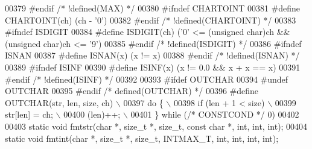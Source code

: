 \begin{DoxyCode}
{00379 \textcolor{preprocessor}{#endif  }\textcolor{comment}{/* !defined(MAX) */}\textcolor{preprocessor}{}
00380 \textcolor{preprocessor}{#ifndef CHARTOINT}
00381 \textcolor{preprocessor}{#define CHARTOINT(ch) (ch - '0')}
00382 \textcolor{preprocessor}{#endif  }\textcolor{comment}{/* !defined(CHARTOINT) */}\textcolor{preprocessor}{}
00383 \textcolor{preprocessor}{#ifndef ISDIGIT}
00384 \textcolor{preprocessor}{#define ISDIGIT(ch) ('0' <= (unsigned char)ch && (unsigned char)ch <= '9')}
00385 \textcolor{preprocessor}{#endif  }\textcolor{comment}{/* !defined(ISDIGIT) */}\textcolor{preprocessor}{}
00386 \textcolor{preprocessor}{#ifndef ISNAN}
00387 \textcolor{preprocessor}{#define ISNAN(x) (x != x)}
00388 \textcolor{preprocessor}{#endif  }\textcolor{comment}{/* !defined(ISNAN) */}\textcolor{preprocessor}{}
00389 \textcolor{preprocessor}{#ifndef ISINF}
00390 \textcolor{preprocessor}{#define ISINF(x) (x != 0.0 && x + x == x)}
00391 \textcolor{preprocessor}{#endif  }\textcolor{comment}{/* !defined(ISINF) */}\textcolor{preprocessor}{}
00392 
00393 \textcolor{preprocessor}{#ifdef OUTCHAR}
00394 \textcolor{preprocessor}{#undef OUTCHAR}
00395 \textcolor{preprocessor}{#endif  }\textcolor{comment}{/* defined(OUTCHAR) */}\textcolor{preprocessor}{}
00396 \textcolor{preprocessor}{#define OUTCHAR(str, len, size, ch)                                          \(\backslash\)}
00397 \textcolor{preprocessor}{do \{                                                                         \(\backslash\)}
00398 \textcolor{preprocessor}{    if (len + 1 < size)                                                  \(\backslash\)}
00399 \textcolor{preprocessor}{        str[len] = ch;                                               \(\backslash\)}
00400 \textcolor{preprocessor}{    (len)++;                                                             \(\backslash\)}
00401 \textcolor{preprocessor}{\} while (}\textcolor{comment}{/* CONSTCOND */}\textcolor{preprocessor}{ 0)}
00402 
00403 \textcolor{keyword}{static} \textcolor{keywordtype}{void} fmtstr(\textcolor{keywordtype}{char} *, \textcolor{keywordtype}{size\_t} *, \textcolor{keywordtype}{size\_t}, \textcolor{keyword}{const} \textcolor{keywordtype}{char} *, \textcolor{keywordtype}{int}, \textcolor{keywordtype}{int}, \textcolor{keywordtype}{int});
00404 \textcolor{keyword}{static} \textcolor{keywordtype}{void} fmtint(\textcolor{keywordtype}{char} *, \textcolor{keywordtype}{size\_t} *, \textcolor{keywordtype}{size\_t}, INTMAX\_T, \textcolor{keywordtype}{int}, \textcolor{keywordtype}{int}, \textcolor{keywordtype}{int}, \textcolor{keywordtype}{int});
}
\end{DoxyCode}
